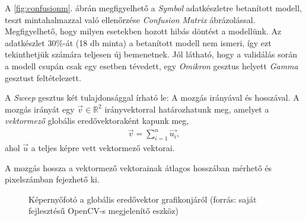 A \ref{fig:confusionm}. ábrán megfigyelhető a \textit{Symbol} adatkészletre betanított modell, teszt mintahalmazzal való ellenőrzése \textit{Confusion Matrix} ábrázolással. Megfigyelhető, hogy milyen esetekben hozott hibás döntést a modellünk. Az adatkészlet 30\%-át (18 db minta) a betanított modell nem ismeri, így ezt tekinthetjük számára teljesen új bemenetnek. Jól látható, hogy a validálás során a modell csupán csak egy esetben tévedett, egy \textit{Omikron} gesztus helyett \textit{Gamma} gesztust feltételezett.



A \textit{Sweep} gesztus két tulajdonsággal írható le: A mozgás irányával és hosszával. A mozgás irányát egy $\vec{v}\in\mathbb{R}^2$ irányvektorral határozhatunk meg, amelyet a \textit{vektormező} globális eredővektoraként kapunk meg,
\begin{align*}
  \vec{v} = \sum_{i=1}^n\vec{u_i},
\end{align*}
ahol $\vec{u}$ a teljes képre vett vektormező vektorai.

A mozgás hossza a vektormező vektorainak átlagos hosszában mérhető és pixelszámban fejezhető ki.
\begin{figure}[h]
\centering
{}
\caption{Képernyőfotó a globális eredővektor grafikonjáról (forrás: saját fejlesztésű OpenCV-s megjelenítő eszköz)}
\label{fig:resultantplot}
\end{figure}

